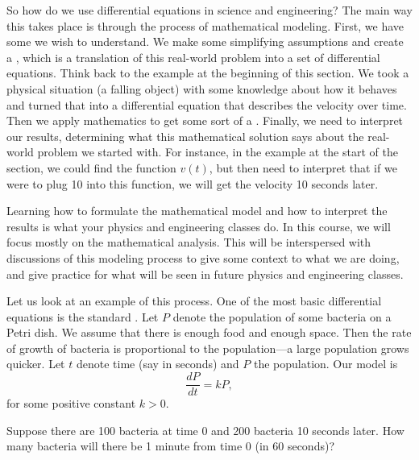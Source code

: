 So how do we use differential equations in science and engineering?  The main way this takes place is through the process of mathematical modeling.
First, we have some \emph{} we wish
to understand.
We make some simplifying assumptions and create a
\emph{}, which is a translation of this real-world problem into a set of differential equations. Think back to the example at the beginning of this section. We took a physical situation (a falling object) with some knowledge about how it behaves and turned that into a differential equation that describes the velocity over time.
Then we apply mathematics to get some sort of a
\emph{}.
Finally, we need to interpret our results, determining what this mathematical solution says about the real-world
problem we started with. For instance, in the example at the start of the section, we could find the function $v(t)$, but then need to interpret that if we were to plug 10 into this function, we will get the velocity 10 seconds later. 

Learning how to formulate the mathematical model and how to interpret the
results is what your physics and engineering classes do.  In this
course, we will focus mostly on the mathematical analysis. This will be interspersed with discussions of this modeling process to give some context to what we are doing, and give practice for what will be seen in future physics and engineering classes.

Let us look at 
an example of this process.
One of the most basic differential equations
is the standard \emph{}.
Let $P$ denote the population 
of some bacteria on a Petri dish.  We assume that there is enough food
and enough space.  Then the rate of growth of bacteria is proportional
to the population---a large population grows quicker.  Let $t$ denote
time (say in seconds) and $P$ the population.  Our model
is
\begin{equation*}
\frac{dP}{dt} = kP ,
\end{equation*}
for some positive constant $k > 0$.

\begin{example}
Suppose there are 100 bacteria at time 0 and 200 bacteria 10 seconds later.
How many bacteria will there be 1 minute from time 0 (in 60 seconds)?
\end{example}


